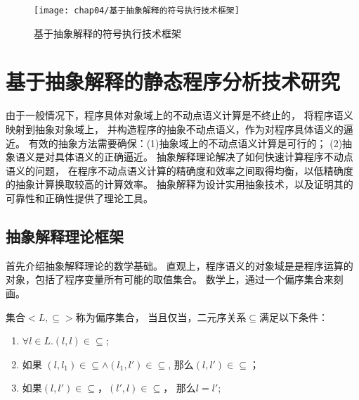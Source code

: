 \begin{figure}[h]
	\centering
	\texttt{[image: chap04/基于抽象解释的符号执行技术框架]}
	\caption{基于抽象解释的符号执行技术框架}
	\label{fig-framework}
\end{figure}




\section{基于抽象解释的静态程序分析技术研究}
\label{sec-absint}

由于一般情况下，程序具体对象域上的不动点语义计算是不终止的，
将程序语义映射到抽象对象域上，
并构造程序的抽象不动点语义，作为对程序具体语义的逼近。
有效的抽象方法需要确保：(1)抽象域上的不动点语义计算是可行的；
(2)抽象语义是对具体语义的正确逼近。
抽象解释理论解决了如何快速计算程序不动点语义的问题，
在程序不动点语义计算的精确度和效率之间取得均衡，以低精确度的抽象计算换取较高的计算效率。
抽象解释为设计实用抽象技术，以及证明其的可靠性和正确性提供了理论工具。




\subsection{抽象解释理论框架}

首先介绍抽象解释理论的数学基础。
直观上，程序语义的对象域是是程序运算的对象，包括了程序变量所有可能的取值集合。
数学上，通过一个偏序集合来刻画。

\begin{definition}
集合$<L, \subseteq>$称为偏序集合，
当且仅当，二元序关系$\subseteq$满足以下条件：
\begin{enumerate}
\item $\forall l \in L. (l,l)\in \subseteq$;
\item 如果 $(l,l_1)\in \subseteq \wedge (l_1, l')\in \subseteq$,
	那么$(l,l')\in \subseteq$；
\item 如果$(l,l')\in \subseteq$，$(l',l)\in \subseteq$，
	那么$l = l'$;
\end{enumerate}
\end{definition}


